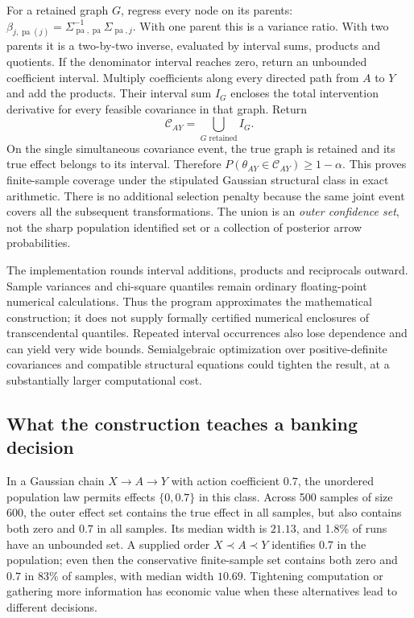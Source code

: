 For a retained graph $G$, regress every node on its parents:
$\beta_{j,\operatorname{pa}(j)}=
\Sigma_{\operatorname{pa},\operatorname{pa}}^{-1}
\Sigma_{\operatorname{pa},j}$. With one parent this is a variance ratio.
With two parents it is a two-by-two inverse, evaluated by interval sums,
products and quotients. If the denominator interval reaches zero, return
an unbounded coefficient interval. Multiply coefficients along every
directed path from $A$ to $Y$ and add the products. Their interval sum
$I_G$ encloses the total intervention derivative for every feasible
covariance in that graph. Return
\begin{equation}
 \mathcal C_{AY}=\bigcup_{G\text{ retained}}I_G.
 \label{s4:graph-effect-set}
\end{equation}
On the single simultaneous covariance event, the true graph is retained
and its true effect belongs to its interval. Therefore
$P(\theta_{AY}\in\mathcal C_{AY})\ge1-\alpha$. This proves finite-sample
coverage under the stipulated Gaussian structural class in exact
arithmetic. There is no additional selection penalty because the same
joint event covers all the subsequent transformations. The union is an
\emph{outer confidence set}, not the sharp population identified set or
a collection of posterior arrow probabilities.

The implementation rounds interval additions, products and reciprocals
outward. Sample variances and chi-square quantiles remain ordinary
floating-point numerical calculations. Thus the program approximates the
mathematical construction; it does not supply formally certified numerical
enclosures of transcendental quantiles. Repeated interval occurrences also
lose dependence and can yield very wide bounds. Semialgebraic optimization
over positive-definite covariances and compatible structural equations
could tighten the result, at a substantially larger computational cost.

\subsection{What the construction teaches a banking decision}
In a Gaussian chain $X\to A\to Y$ with action coefficient $0.7$,
the unordered population law permits effects $\{0,0.7\}$ in this
class. Across 500 samples of size 600, the outer effect set contains the
true effect in all samples, but also contains both zero and $0.7$ in
all samples. Its median width is $21.13$, and 1.8\% of runs have an
unbounded set. A supplied order $X\prec A\prec Y$ identifies $0.7$
in the population; even then the conservative finite-sample set contains
both zero and $0.7$ in 83\% of samples, with median width $10.69$.
Tightening computation or gathering more information has economic value
when these alternatives lead to different decisions.

